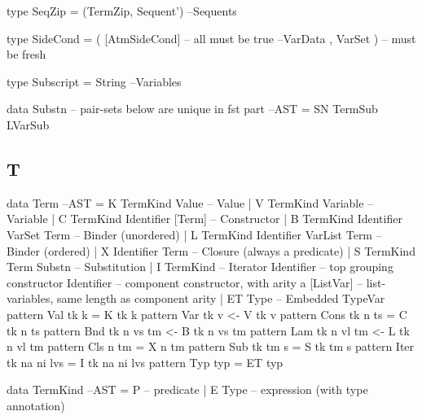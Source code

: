 \begin{code}
type SeqZip = (TermZip, Sequent')                                   --Sequents
\end{code}

\begin{code}
type SideCond = ( [AtmSideCond]  -- all must be true                 --VarData
                , VarSet )       -- must be fresh
\end{code}


\begin{code}
type Subscript = String                                            --Variables
\end{code}

\begin{code}
data Substn --  pair-sets below are unique in fst part                  --AST
  = SN TermSub LVarSub
\end{code}

\subsection{T}

\begin{code}
data Term                                                                --AST
 = K TermKind Value                    -- Value
 | V TermKind Variable                 -- Variable
 | C TermKind Identifier [Term]        -- Constructor
 | B TermKind Identifier VarSet Term   -- Binder (unordered)
 | L TermKind Identifier VarList Term  -- Binder (ordered)
 | X Identifier Term                   -- Closure (always a predicate)
 | S TermKind Term Substn              -- Substitution
 | I TermKind                          -- Iterator
     Identifier  -- top grouping constructor
     Identifier  -- component constructor, with arity a
     [ListVar]   -- list-variables, same length as component arity
 | ET Type                              -- Embedded TypeVar
pattern Val  tk k          =   K tk k
pattern Var  tk v          <-  V tk v
pattern Cons tk n ts       =   C tk n ts
pattern Bnd  tk n vs tm    <-  B tk n vs tm
pattern Lam  tk n vl tm    <-  L tk n vl tm
pattern Cls     n    tm    =   X n tm
pattern Sub  tk tm s       =   S tk tm s
pattern Iter tk na ni lvs  =   I tk na ni lvs
pattern Typ  typ           =   ET typ
\end{code}

\begin{code}
data TermKind                                                            --AST
 = P -- predicate
 | E Type -- expression (with type annotation)
\end{code}

